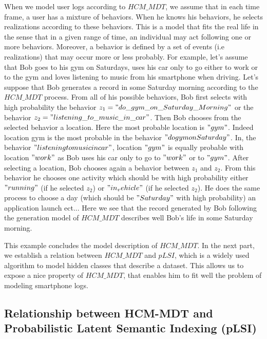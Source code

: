 When we model user logs according to $HCM\_MDT$, we assume that in each time frame, a user has a mixture of behaviors. When he knows his behaviors, he selects realizations according to these behaviors. This is a model that fits the real life in the sense that in a given range of time, an individual may act following one or more behaviors. Moreover, a behavior is defined by a set of events (i.e realizations) that may occur more or less probably. For example, let's assume that Bob goes to his gym on Saturdays, uses his car only to go either to work or to the gym and loves listening to music from his smartphone when driving. Let's suppose that Bob generates a record in some Saturday morning according to the $HCM\_MDT$ process. From all of his possible behaviors, Bob first selects with high probability the behavior $z_{1}="do\_gym\_on\_Saturday\_Morning"$ or the behavior $z_{2}="listening\_to\_music\_in\_car"$. Then Bob chooses from the selected behavior a location. Here the most probable location is $"gym"$. Indeed location gym is the most probable in the behavior $"do gym on Saturday"$. In, the behavior $"listening to music in car"$, location $"gym"$ is equally probable with location $"work"$ as Bob uses his car only to go to $"work"$ or to $"gym"$. After selecting a location, Bob chooses again a behavior between $z_{1}$ and $z_{2}$. From this behavior he chooses one activity which should be with high probability either $"running"$ (if he selected $z_{2}$) or $"in_vehicle"$ (if he selected $z_{2}$). He does the same process to choose a day (which should be $"Saturday"$ with high probability) an application launch ect... Here we see that the record generated by Bob following the generation model of $HCM\_MDT$ describes well Bob's life in some Saturday morning. \par

This example concludes the model description of $HCM\_MDT$. In the next part, we establish a relation between $HCM\_MDT$ and $pLSI$, which is a widely used algorithm to model hidden classes that describe a dataset. This allows us to expose a nice property of $HCM\_MDT$, that enables him to fit well the problem of modeling smartphone logs.


\subsection{Relationship between HCM-MDT and Probabilistic Latent Semantic Indexing (pLSI)}

